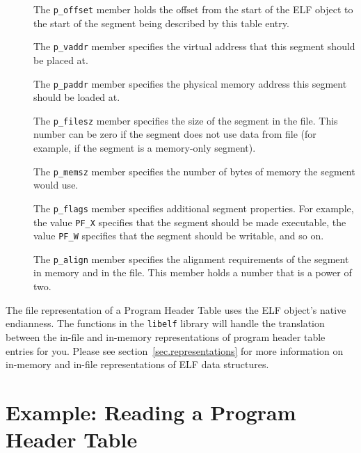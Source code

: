 \documentclass[a4paper,pdftex]{book}
\makeatletter
\newcommand{\constant}[1]{\texttt{#1}}
\newcommand{\library}[1]{\texttt{#1}}
\newcommand{\parameter}[1]{\texttt{#1}}
\newcommand{\elfdatastructure}[1]{\textsf{#1}}
\newenvironment{callout}[2][black]{%
  \begingroup\newcommand{\@cocolor}{#1}%
  \setlength{\shadowsize}{1.2pt}%
  \newcommand{\@cogroup}[1]{#2}}{\endgroup}
\newcommand{\@co}[1]{\shadowbox{\color{\@cocolor}#1}}
\newcommand{\coref}[1]{%
  \hypertarget{\@cogroup.#1.cr}{%
    \hyperlink{\@cogroup.#1.co}{\@co{#1}}}}
\makeatother
\begin{document}
\begin{callout}{phdr}
\begin{description}
  \item[\coref{2}] The \parameter{p\_offset} member holds the offset
    from the start of the ELF object to the start of the segment being
    described by this table entry.

  \item[\coref{3}] The \parameter{p\_vaddr} member specifies the
    virtual address that this segment should be placed
    at.

  \item[\coref{4}] The \parameter{p\_paddr} member specifies the
    physical memory address this segment should be loaded at.

  \item[\coref{5}] The \parameter{p\_filesz} member specifies the size
    of the segment in the file.  This number can be zero if the
    segment does not use data from file (for example, if the segment
    is a memory-only segment).

  \item[\coref{6}] The \parameter{p\_memsz} member specifies the
    number of bytes of memory the segment would use.%

  \item[\coref{7}] The \parameter{p\_flags} member specifies
    additional segment properties.  For example, the value
    \constant{PF\_X} specifies that the segment should be made
    executable, the value \constant{PF\_W} specifies that the segment
    should be writable, and so on.

  \item[\coref{8}] The \parameter{p\_align} member specifies the
    alignment requirements of the segment in memory and in the file.
    This member holds a number that is a power of two.
  \end{description}
\end{callout}

The file representation of a \elfdatastructure{Program Header Table}
uses the ELF object's native endianness. The functions in the
\library{libelf} library will handle the translation between the
in-file and in-memory representations of program header table entries
for you. Please see section~\vref{sec.representations} for more
information on in-memory and in-file representations of ELF data
structures.

\section{Example: Reading a Program Header Table}
\end{document}
